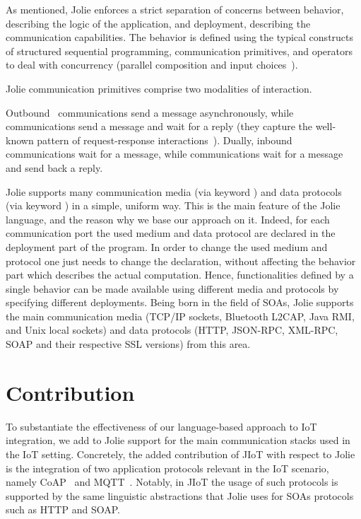 As mentioned, Jolie enforces a strict separation of concerns between behavior,
describing the logic of the application, and deployment, describing the
communication capabilities. The behavior is defined using the typical
constructs of structured sequential programming, communication primitives, and
operators to deal with concurrency (parallel composition and input
choices~\cite{MontesiGZ14}).

Jolie communication primitives comprise two modalities of interaction.

Outbound~ communications send a message asynchronously, while
 communications send a message and wait for a reply (they
capture the well-known pattern of request-response
interactions~\cite{req-rep}). Dually, inbound  communications wait
for a message, while  communications wait for a message
and send back a reply.

%
Jolie supports many communication media (via keyword
) and data protocols (via keyword ) in a simple,
uniform way. This is the main feature of the Jolie language, and the reason why
we base our approach on it.
%
Indeed, for each communication port the used medium and data protocol are
declared in the deployment part of the program.  In order to change the
used medium and protocol one just needs to change the declaration, without
affecting the behavior part which describes the actual computation.
Hence, functionalities defined by a single behavior can be made available using
different media and protocols by specifying different deployments. Being born
in the field of SOAs, Jolie supports the main communication media (TCP/IP
sockets, Bluetooth L2CAP, Java RMI, and Unix local sockets) and data protocols
(HTTP, JSON-RPC, XML-RPC, SOAP and their respective SSL versions) from this
area.

\section{Contribution}
\label{sec:contribution}
To substantiate the effectiveness of our language-based approach to IoT
integration, we add to Jolie support for the main communication stacks used in the
IoT setting. Concretely, the added contribution of JIoT with respect to Jolie
is the integration of two application protocols relevant in the IoT scenario,
namely CoAP~\cite{doi:10.17487/RFC7252,coap} and MQTT~\cite{mqtt-v3.1.1,mqtt}.
Notably, in JIoT the usage of such protocols is supported by the same
linguistic abstractions that Jolie uses for SOAs protocols such as HTTP and
SOAP.

